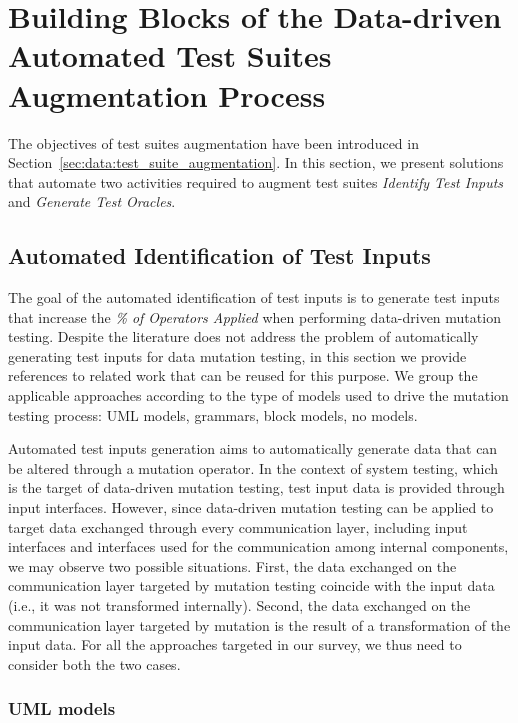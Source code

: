 
\section{Building Blocks of the Data-driven Automated Test Suites Augmentation Process}
\label{sec:testGenerationData}

The objectives of test suites augmentation have been introduced in Section~\ref{sec:data:test_suite_augmentation}.
In this section, we present solutions that automate two activities required to augment test suites
\emph{Identify Test Inputs} and \emph{Generate Test Oracles}.

\subsection{Automated Identification of Test Inputs}

The goal of the automated identification of test inputs is to generate test inputs that increase the \emph{\% of Operators Applied} when performing data-driven mutation testing. Despite the literature does not address the problem of automatically generating test inputs for data mutation testing, in this section we provide references to related work that can be reused for this purpose. We group the applicable approaches according to the type of models used to drive the mutation testing process: UML models, grammars, block models, no models. 

Automated test inputs generation aims to automatically generate data that can be altered through a mutation operator. 
In the context of system testing, which is the target of data-driven mutation testing, test input data is provided through input interfaces. However, since data-driven mutation testing can be applied to target data exchanged through 
every communication layer, including input interfaces and interfaces used for the communication among internal components, we may observe two possible situations. First, the data exchanged on the communication layer targeted by mutation testing coincide with the input data (i.e., it was not transformed internally). Second, the data exchanged on the communication layer targeted by mutation is the result of a transformation of the input data. For all the approaches targeted in our survey, we thus need to consider both the two cases.

\subsubsection{UML models}

